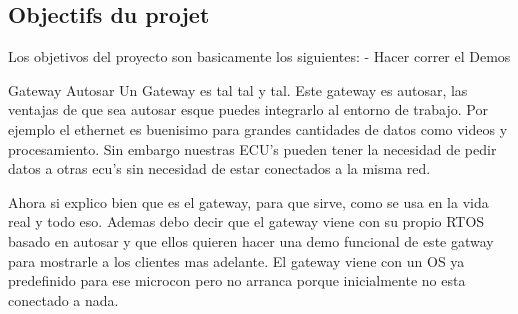 \subsection{Objectifs du projet}

Los objetivos del proyecto son basicamente los siguientes:
- Hacer correr el Demos

Gateway Autosar
Un Gateway es tal tal y tal. Este gateway es autosar, las ventajas de que sea autosar esque puedes integrarlo  al entorno de trabajo. Por ejemplo el ethernet es buenisimo para grandes cantidades de datos como videos y procesamiento. Sin embargo nuestras ECU's pueden tener la necesidad de pedir datos a otras ecu's sin necesidad de estar conectados a la misma red.

Ahora si explico bien que es el gateway, para que sirve, como se usa en la vida real y todo eso. Ademas debo decir que el gateway viene con su propio RTOS basado en autosar y que ellos quieren hacer una demo funcional de este gatway para mostrarle a los clientes mas adelante. El gateway viene con un OS ya predefinido para ese microcon pero no arranca porque inicialmente no esta conectado a nada.